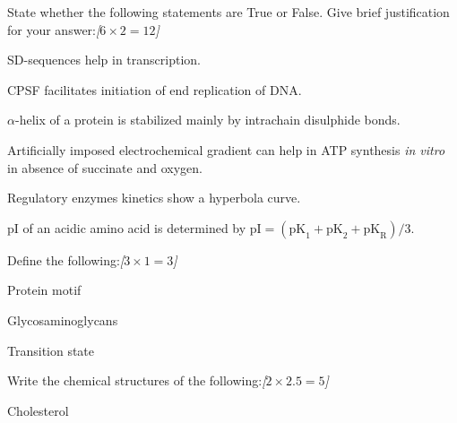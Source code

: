 \documentclass[11pt,a4paper]{article}
\newcommand{\pts}[1]{\hfill   \textit{[#1]}}
\begin{document}
\begin{parts}
  \item State whether the following statements are True or False. Give brief justification for your answer:\pts{$6  \times 2 = 12$}
  
\begin{parts}
    \item SD-sequences help in transcription.
    \item CPSF facilitates initiation of end replication of DNA.
    \item $\alpha$-helix of a protein is stabilized mainly by intrachain disulphide bonds.
    \item Artificially imposed electrochemical gradient can help in ATP synthesis   \textit{in vitro} in absence of succinate and oxygen.
    \item Regulatory enzymes kinetics show a hyperbola curve.
    \item pI of an acidic amino acid is determined by $ \text{pI} = ( \text{pK}_1 +  \text{pK}_2 +  \text{pK}_{ \text{R}})/3$.
  \end{parts}
  
  \item Define the following:\pts{$3  \times 1 = 3$}
  
\begin{parts}
    \item Protein motif
    \item Glycosaminoglycans
    \item Transition state
  \end{parts}

  \item Write the chemical structures of the following:\pts{$2  \times 2.5 = 5$}
  
\begin{parts}
    \item Cholesterol
    
    
\begin{center}
    
\end{center}
\end{parts}
\end{parts}
\end{document}
